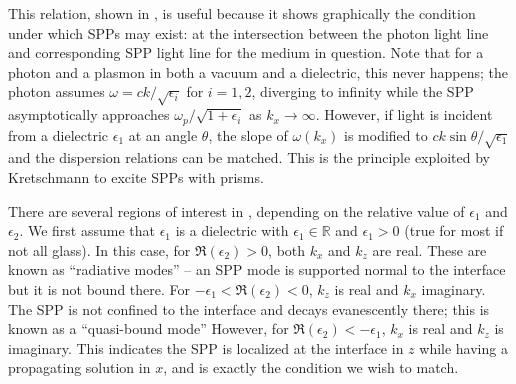 This relation, shown in , is useful because
it shows graphically the condition under which SPPs may exist: at the
intersection between the photon light line and corresponding SPP light line
for the medium in question.  Note that for a photon and a plasmon in both a
vacuum and a dielectric, this never happens; the photon assumes $\omega = c
k /\sqrt{\epsilon_i}$ for $i=1,2$, diverging to infinity while the SPP
asymptotically approaches $\omega_p/\sqrt{1+\epsilon_i}$ as $k_x\to\infty$.
However, if light is incident from a dielectric $\epsilon_1$ at an angle
$\theta$, the slope of $\omega(k_x)$ is modified to $c k \sin
\theta/\sqrt{\epsilon_1}$ and the dispersion relations can be matched.
This is the principle exploited by Kretschmann \cite{kretschmann1968} to
excite SPPs with prisms.

There are several regions of interest in ,
depending on the relative value of $\epsilon_1$ and $\epsilon_2$.  We first
assume that $\epsilon_1$ is a dielectric with $\epsilon_1\in\mathbb{R}$ and
$\epsilon_1 > 0$ (true for most if not all glass).  In this case, for
$\Re(\epsilon_2)>0$, both $k_x$ and $k_z$ are real.  These are known as
``radiative modes'' -- an SPP mode is supported normal to the interface but
it is not bound there.  For $-\epsilon_1<\Re(\epsilon_2)<0$, $k_z$ is real
and $k_x$ imaginary.  The SPP is not confined to the interface and decays
evanescently there; this is known as a ``quasi-bound mode''  However, for
$\Re(\epsilon_2)<-\epsilon_1$, $k_x$ is real and $k_z$ is imaginary.  This
indicates the SPP is localized at the interface in $z$ while having a
propagating solution in $x$, and is exactly the condition we wish to match.
